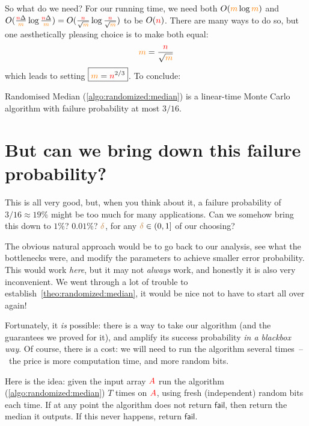 So what do we need? For our running time, we need both $O(\textcolor{orange}{m}\log\textcolor{orange}{m})$ and $O(\frac{{\textcolor{red}{n}}\Delta}{\textcolor{orange}{m}}\log\frac{{\textcolor{red}{n}}\Delta}{\textcolor{orange}{m}}) =O(\frac{{\textcolor{red}{n}}}{\sqrt{\textcolor{orange}{m}}}\log \frac{{\textcolor{red}{n}}}{\sqrt{\textcolor{orange}{m}}})$ to be $O({\textcolor{red}{n}})$. There are many ways to do so, but one aesthetically pleasing choice is to make both equal:
\[
    \textcolor{orange}{m} = \frac{{\textcolor{red}{n}}}{\sqrt{\textcolor{orange}{m}}}
\]
which leads to setting $\boxed{\textcolor{orange}{m} = {\textcolor{red}{n}}^{2/3}}$. To conclude:
\begin{theorem}
    \label{theo:randomized:median}
    Randomised Median (\cref{algo:randomized:median}) is a linear-time Monte Carlo algorithm with failure probability at most $3/16$.
\end{theorem}

\section{But can we bring down this failure probability?}
This is all very good, but, when you think about it, a failure probability of $3/16\approx 19\%$ might be too much for many applications. Can we somehow bring this down to $1\%$? $0.01\%$? ${\textcolor{brown}{\delta}}$, for any ${\textcolor{brown}{\delta}}\in(0,1]$ of our choosing?

The obvious natural approach would be to go back to our analysis, see what the bottlenecks were, and modify the parameters to achieve smaller error probability. This would work \emph{here}, but it may not \emph{always} work, and honestly it is also very inconvenient. We went through a lot of trouble to establish~\cref{theo:randomized:median}, it would be nice not to have to start all over again!

Fortunately, it \emph{is} possible: there is a way to take our algorithm (and the guarantees we proved for it), and amplify its success probability \emph{in a blackbox way}. Of course, there is a cost: we will need to run the algorithm several times~--~the price is more computation time, and more random bits.

Here is the idea: given the input array $\textcolor{red}{A}$ run the algorithm (\cref{algo:randomized:median}) $T$ times on $\textcolor{red}{A}$, using fresh (independent) random bits each time. If at any point the algorithm does not return $\textsf{fail}$, then return the median it outputs. If this never happens, return $\textsf{fail}$.

